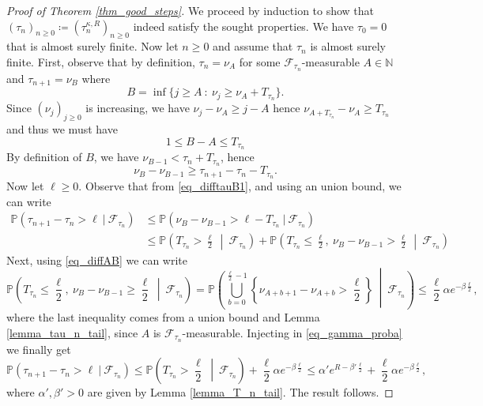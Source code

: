 \documentclass[a4paper, 11pt]{article}
\theoremstyle{plain}
\theoremstyle{definition}
\newcommand{\N}{\mathbb{N}}
\renewcommand{\P}{\mathbb{P}}
\numberwithin{equation}{section}
\begin{document}
\begin{proof}[Proof of Theorem \ref{thm_good_steps}]
    We proceed by induction to show that $(\tau_n)_{n\geq 0}\coloneqq (\tau_n^{\kappa, R})_{n\geq 0}$ indeed satisfy the sought properties. We have $\tau_0=0$ that is almost surely finite. Now let $n\geq0$ and assume that $\tau_n$ is almost surely finite. First, observe that by definition, $\tau_n=\nu_A$ for some $\mathcal F_{\tau_n}$-measurable $A\in\N$ and $\tau_{n+1}=\nu_B$ where
        \[B=\inf\{j\geq A~:~\nu_j\geq\nu_A+T_{\tau_n}\}.\]
    Since $(\nu_j)_{j\geq 0}$ is increasing, we have $\nu_j-\nu_A\geq j-A$ hence $\nu_{A+T_{\tau_n}}-\nu_A\geq T_{\tau_n}$ and thus we must have
    \begin{equation}
        \label{eq_diffAB}
        1\leq B-A\leq T_{\tau_n}
    \end{equation}
    By definition of $B$, we have $\nu_{B-1}<\tau_n+T_{\tau_n}$, hence
    \begin{equation}
        \label{eq_difftauB1}
        \nu_B-\nu_{B-1}\geq\tau_{n+1}-\tau_n-T_{\tau_n}.
    \end{equation}
    Now let $\ell\geq 0$. Observe that from \eqref{eq_difftauB1}, and using an union bound, we can write
        \begin{equation}
            \label{eq_gamma_proba}
            \begin{split}
                \P\left(\tau_{n+1}-\tau_n>\ell~\vert~\mathcal F_{\tau_n}\right)&\leq\P(\nu_B-\nu_{B-1}> \ell-T_{\tau_n}~\vert~\mathcal F_{\tau_n})\\
                &\leq\P\left(T_{\tau_n}>\frac{\ell}{2}~\middle\vert~\mathcal F_{\tau_n}\right)+\P\left(T_{\tau_n}\leq\frac{\ell}{2},~\nu_B-\nu_{B-1}> \frac{\ell}{2}~\middle\vert~\mathcal F_{\tau_n}\right)
            \end{split}
        \end{equation}
    Next, using \eqref{eq_diffAB} we can write
        \begin{equation*}
            \P\left(T_{\tau_n}\leq\frac{\ell}{2},~\nu_B-\nu_{B-1}\geq \frac{\ell}{2}~\middle\vert~\mathcal F_{\tau_n}\right)=\P\left(\bigcup_{b=0}^{\frac{\ell}{2}-1}\left\lbrace\nu_{A+b+1}-\nu_{A+b}>\frac{\ell}{2}\right\rbrace~\middle\vert~\mathcal F_{\tau_n}\right)
            \leq\frac{\ell}{2}\alpha e^{-\beta\frac{\ell}{2}},
        \end{equation*}
    where the last inequality comes from a union bound and Lemma \ref{lemma_tau_n_tail}, since $A$ is $\mathcal F_{\tau_n}$-measurable. Injecting in \eqref{eq_gamma_proba} we finally get
        \begin{equation*}
            \P\left(\tau_{n+1}-\tau_n>\ell~\vert~\mathcal F_{\tau_n}\right)\leq\P\left(T_{\tau_n}>\frac{\ell}{2}~\middle\vert~\mathcal F_{\tau_n}\right)+\frac{\ell}{2}\alpha e^{-\beta\frac{\ell}{2}}
            \leq\alpha'e^{R-\beta'\frac{\ell}{2}}+\frac{\ell}{2}\alpha e^{-\beta\frac{\ell}{2}},
        \end{equation*}
    where $\alpha', \beta'>0$ are given by Lemma \ref{lemma_T_n_tail}. The result follows.
\end{proof}
\end{document}
